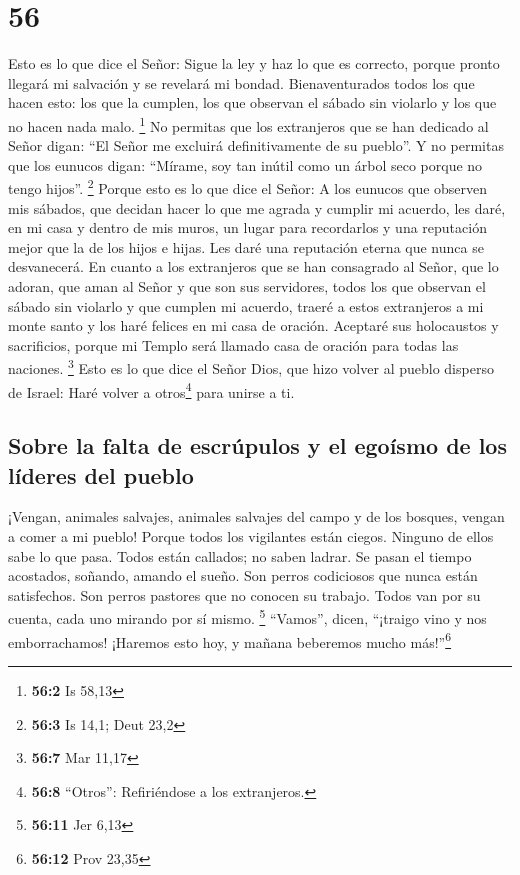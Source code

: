 \hypertarget{section-55}{%
\section{56}\label{section-55}}

 Esto es lo que dice el Señor: Sigue la ley y haz lo que
es correcto, porque pronto llegará mi salvación y se revelará mi bondad.
 Bienaventurados todos los que hacen esto: los que la
cumplen, los que observan el sábado sin violarlo y los que no hacen nada
malo. \footnote{\textbf{56:2} Is 58,13}  No permitas que
los extranjeros que se han dedicado al Señor digan: ``El Señor me
excluirá definitivamente de su pueblo''. Y no permitas que los eunucos
digan: ``Mírame, soy tan inútil como un árbol seco porque no tengo
hijos''. \footnote{\textbf{56:3} Is 14,1; Deut 23,2} 
Porque esto es lo que dice el Señor: A los eunucos que observen mis
sábados, que decidan hacer lo que me agrada y cumplir mi acuerdo,
 les daré, en mi casa y dentro de mis muros, un lugar para
recordarlos y una reputación mejor que la de los hijos e hijas. Les daré
una reputación eterna que nunca se desvanecerá.  En cuanto
a los extranjeros que se han consagrado al Señor, que lo adoran, que
aman al Señor y que son sus servidores, todos los que observan el sábado
sin violarlo y que cumplen mi acuerdo,  traeré a estos
extranjeros a mi monte santo y los haré felices en mi casa de oración.
Aceptaré sus holocaustos y sacrificios, porque mi Templo será llamado
casa de oración para todas las naciones. \footnote{\textbf{56:7} Mar
  11,17}  Esto es lo que dice el Señor Dios, que hizo
volver al pueblo disperso de Israel: Haré volver a otros\footnote{\textbf{56:8}
  ``Otros'': Refiriéndose a los extranjeros.} para unirse a ti.

\hypertarget{sobre-la-falta-de-escruxfapulos-y-el-egouxedsmo-de-los-luxedderes-del-pueblo}{%
\subsection{Sobre la falta de escrúpulos y el egoísmo de los líderes del
pueblo}\label{sobre-la-falta-de-escruxfapulos-y-el-egouxedsmo-de-los-luxedderes-del-pueblo}}

 ¡Vengan, animales salvajes, animales salvajes del campo y
de los bosques, vengan a comer a mi pueblo!  Porque todos
los vigilantes están ciegos. Ninguno de ellos sabe lo que pasa. Todos
están callados; no saben ladrar. Se pasan el tiempo acostados, soñando,
amando el sueño.  Son perros codiciosos que nunca están
satisfechos. Son perros pastores que no conocen su trabajo. Todos van
por su cuenta, cada uno mirando por sí mismo. \footnote{\textbf{56:11}
  Jer 6,13}  ``Vamos'', dicen, ``¡traigo vino y nos
emborrachamos! ¡Haremos esto hoy, y mañana beberemos mucho
más!''\footnote{\textbf{56:12} Prov 23,35}


